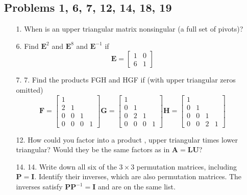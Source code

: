 \begin{itemize}
  \item []

    \subsection{Problems 1, 6, 7, 12, 14, 18, 19}
    \begin{itemize}\color{foreground-2}
      \item[1.] When is an upper triangular matrix nonsingular (a full set of
        pivots)?

      \item[6.] Find \( \bm{E}^2 \) and \( \bm{E}^8 \) and \( \bm{E}^{-1} \) if
      \[%
      \bm{E} = \begin{bmatrix}
      1 & 0 \\
      6 & 1
      \end{bmatrix}
      \]%

      \item[7.] 7. Find the products FGH and HGF if (with upper triangular zeros omitted)
        \[%
        \bm{F} = \begin{bmatrix}
        1 &  &  \\
        2 & 1 &  \\
        0 & 0 & 1 \\
        0 & 0 & 0 & 1
        \end{bmatrix}
        \bm{G} = \begin{bmatrix}
        1 &  &  \\
        0 & 1 &  \\
        0 & 2 & 1 \\
        0 & 0 & 0 & 1
        \end{bmatrix}
        \bm{H} = \begin{bmatrix}
        1 &  &  \\
        0 & 1 &  \\
        0 & 0 & 1 \\
        0 & 0 & 2 & 1
        \end{bmatrix}
        \]%

      \item[12.]  How could you factor  into a product , upper
        triangular times lower triangular? Would they be the same factors as in
        \( \bm{A} = \bm{LU} \)?

      \item[14.] 14. Write down all six of the \( 3\times 3 \) permutation matrices,
        including \(\bm{P} = \bm{I}\). Identify their inverses, which are also
        permutation matrices. The inverses satisfy \(\bm{PP}^{-1} = \bm{I}\)
        and are on the same list.


\end{itemize}
\end{itemize}
